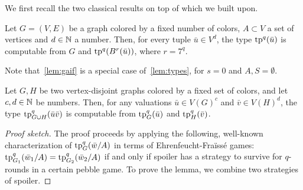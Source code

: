 

 We first recall the two classical results on top of which we built upon.
\medskip



\begin{lemma}\label{lem:gaif}
  Let $G=(V,E)$ be a graph colored by a fixed number of colors, $A\subset V$ a set of vertices and $d\in \mathbb{N}$ a number.
  Then, for every tuple $\bar u\in V^d$, the type  $\mathrm{tp}^q(\bar u)$ is computable from $G$ and $\mathrm{tp}^q(B^r(\bar u))$, where $r=7^q$.
\end{lemma}
Note that~\ref{lem:gaif} is a special case of~\cref{lem:types},
for $s=0$ and $A,S=\emptyset$.


\begin{lemma}\label{lem:fv}
  Let $G,H$ be two vertex-disjoint  graphs colored by a fixed set of colors, and let 
  $c,d\in\mathbb{N}$  be numbers.
    Then, for any valuations
 $\bar u\in V(G)^{c}$ and $\bar v\in V(H)^{d}$, 
 the type 
 $\mathrm{tp}^q_{G\cup H}(\bar u\bar v)$
 is computable from $\mathrm{tp}^q_G(\bar u)$
 and $\mathrm{tp}^q_H(\bar v)$.
\end{lemma}
\begin{proof}[Proof sketch]The proof proceeds by applying the following, well-known characterization of $\mathrm{tp}^q_G(\bar w/A)$ in terms of Ehrenfeucht-Fra\"iss\'e games:
$\mathrm{tp}^q_{G_1}(\bar w_1/A)=\mathrm{tp}^q_{G_2}(\bar w_2/A)$
if and only if spoiler has a strategy to survive for $q$-rounds in a certain pebble game.
To prove the lemma, we combine two strategies of spoiler.
\end{proof}


